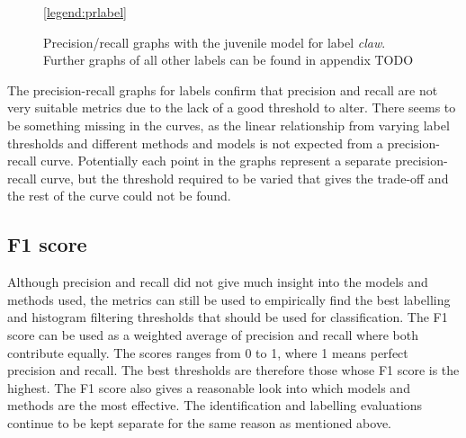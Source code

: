 \begin{figure}[H]
\centering
{}
\ref{legend:prlabel}
\caption{Precision/recall graphs with the juvenile model for label \textit{claw}. Further graphs of all other labels can be found in appendix TODO}
\end{figure}
\noindent
The precision-recall graphs for labels confirm that precision and recall are not very suitable metrics due to the lack of a good threshold to alter. There seems to be something missing in the curves, as the linear relationship from varying label thresholds and different methods and models is not expected from a precision-recall curve. Potentially each point in the graphs represent a separate precision-recall curve, but the threshold required to be varied that gives the trade-off and the rest of the curve could not be found.
%
%
%


\subsection{F1 score}
Although precision and recall did not give much insight into the models and methods used, the metrics can still be used to empirically find the best labelling and histogram filtering thresholds that should be used for classification. The F1 score can be used as a weighted average of precision and recall where both contribute equally. The scores ranges from 0 to 1, where 1 means perfect precision and recall. The best thresholds are therefore those whose F1 score is the highest. The F1 score also gives a reasonable look into which models and methods are the most effective. The identification and labelling evaluations continue to be kept separate for the same reason as mentioned above. 
